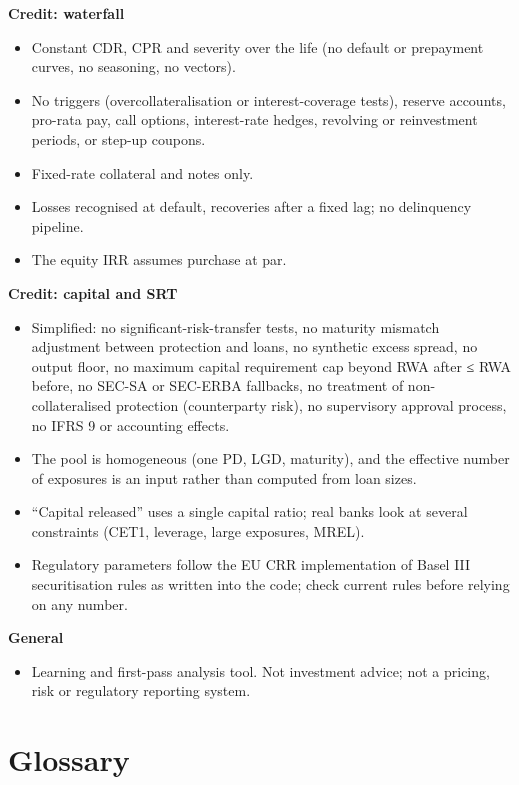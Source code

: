 \documentclass[10pt,a4paper]{article}
\providecommand{\tightlist}{\setlength{\itemsep}{1pt}\setlength{\parskip}{0pt}}
\numberwithin{equation}{section}
\begin{document}
\textbf{Credit: waterfall}

\begin{itemize}
\tightlist
\item
  Constant CDR, CPR and severity over the life (no default or prepayment curves, no seasoning, no vectors).
\item
  No triggers (overcollateralisation or interest-coverage tests), reserve accounts, pro-rata pay, call options, interest-rate hedges, revolving or reinvestment periods, or step-up coupons.
\item
  Fixed-rate collateral and notes only.
\item
  Losses recognised at default, recoveries after a fixed lag; no delinquency pipeline.
\item
  The equity IRR assumes purchase at par.
\end{itemize}

\textbf{Credit: capital and SRT}

\begin{itemize}
\tightlist
\item
  Simplified: no significant-risk-transfer tests, no maturity mismatch adjustment between protection and loans, no synthetic excess spread, no output floor, no maximum capital requirement cap beyond RWA after ≤ RWA before, no SEC-SA or SEC-ERBA fallbacks, no treatment of non-collateralised protection (counterparty risk), no supervisory approval process, no IFRS 9 or accounting effects.
\item
  The pool is homogeneous (one PD, LGD, maturity), and the effective number of exposures is an input rather than computed from loan sizes.
\item
  ``Capital released'' uses a single capital ratio; real banks look at several constraints (CET1, leverage, large exposures, MREL).
\item
  Regulatory parameters follow the EU CRR implementation of Basel III securitisation rules as written into the code; check current rules before relying on any number.
\end{itemize}

\textbf{General}

\begin{itemize}
\tightlist
\item
  Learning and first-pass analysis tool. Not investment advice; not a pricing, risk or regulatory reporting system.
\end{itemize}

\section{Glossary}\label{glossary}
\end{document}
